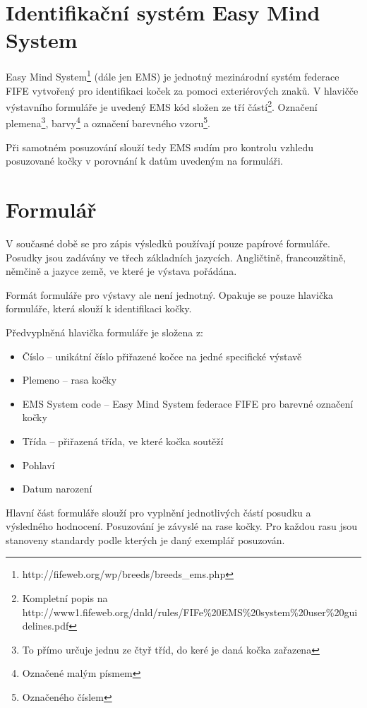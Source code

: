 \documentclass[11pt, oneside]{fithesis2}
\begin{document}
\section{Identifikační systém Easy Mind System}
Easy Mind System\footnote {http://fifeweb.org/wp/breeds/breeds\_ems.php} (dále jen EMS) je jednotný mezinárodní systém federace FIFE
vytvořený pro identifikaci koček za pomoci exteriérových znaků.
V hlavičče výstavního formuláře je uvedený EMS kód složen ze tří částí\footnote{Kompletní popis na http://www1.fifeweb.org/dnld/rules/FIFe\%20EMS\%20system\%20user\%20guidelines.pdf}.
Označení plemena\footnote{To přímo určuje jednu ze čtyř tříd, do keré je daná kočka zařazena}, barvy\footnote{Označené malým písmem} a označení barevného vzoru\footnote{Označeného číslem}.


Při samotném posuzování slouží tedy EMS sudím pro kontrolu vzhledu posuzované kočky v porovnání k datům uvedeným na formuláři.

\section{Formulář}
V současné době se pro zápis výsledků používají pouze papírové formuláře. Posudky jsou zadávány ve třech základních jazycích.
Angličtině, francouzštině, němčině a jazyce země, ve které je výstava pořádána. 

Formát formuláře pro výstavy ale není jednotný. Opakuje se pouze hlavička formuláře, která slouží k identifikaci kočky.
\linebreak

Předvyplněná hlavička formuláře je složena z:
\begin{itemize}
\item Číslo -- unikátní číslo přiřazené kočce na jedné specifické výstavě
\item Plemeno -- rasa kočky
\item EMS System code -- Easy Mind System federace FIFE pro barevné označení kočky
\item Třída -- přiřazená třída, ve které kočka soutěží
\item Pohlaví
\item Datum narození
\end{itemize}

Hlavní část formuláře slouží pro vyplnění jednotlivých částí posudku a výsledného hodnocení.
Posuzování je závyslé na rase kočky. Pro každou rasu jsou stanoveny standardy podle kterých je daný exemplář posuzován.
\linebreak
\end{document}
